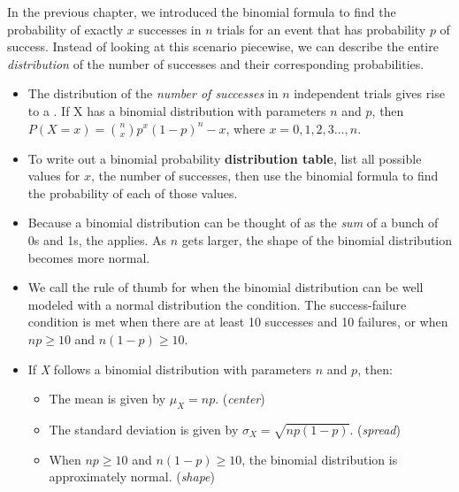 \noindent In the previous chapter, we introduced the binomial formula to find the probability of exactly $x$ successes in $n$ trials for an event that has probability $p$ of success.  Instead of looking at this scenario piecewise, we can describe the entire \textit{distribution} of the number of successes and their corresponding probabilities.  
\begin{itemize}
\item The distribution of the \textit{number of successes} in $n$ independent trials gives rise to a .  If X has a binomial distribution with parameters $n$ and $p$, then \\
$P(X=x) = {n\choose x}p^x(1-p)^n-x$, where $x=0,1,2,3\dots,n$.

\item To write out a binomial probability \textbf{distribution table}, list all possible values for $x$, the number of successes, then use the binomial formula to find the probability of each of those values.  

\item Because a binomial distribution can be thought of as the \emph{sum} of a bunch of 0s and 1s, the  applies.  As $n$ gets larger, the shape of the binomial distribution becomes more normal.  

\item  We call the rule of thumb for when the binomial distribution can be well modeled with a normal distribution the  condition.  The success-failure condition is met when there are at least 10 successes and 10 failures, or when $np\ge 10$ and $n(1-p)\ge 10$.

\item If \textit{X} follows a binomial distribution with parameters $n$ and $p$, then:
\begin{itemize}\vspace{-1mm}
\setlength{\itemsep}{0mm}
\item The mean is given by $\mu_{\scriptscriptstyle{X}} = np$. \quad (\emph{center})
\item The standard deviation is given by $\sigma_{\scriptscriptstyle{X}} = \sqrt{np(1-p)}$. \quad (\emph{spread})
\item When $np\ge 10$ and $n(1-p)\ge 10$, the binomial distribution is approximately normal.  \quad (\emph{shape})
\end{itemize}


\end{itemize}
